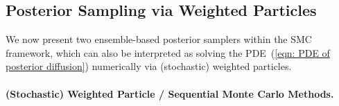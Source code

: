 \documentclass{article}
\numberwithin{equation}{section}
\def\eqref#1{(\ref{#1})}
\begin{document}
\subsection{Posterior Sampling via Weighted Particles}
\label{subsection: algorithm details}

We now present two ensemble-based posterior samplers within the SMC framework, which can also be interpreted as solving the PDE~\eqref{eqn: PDE of posterior diffusion} numerically via (stochastic) weighted particles.

\paragraph{(Stochastic) Weighted Particle / Sequential Monte Carlo Methods.}
\end{document}
